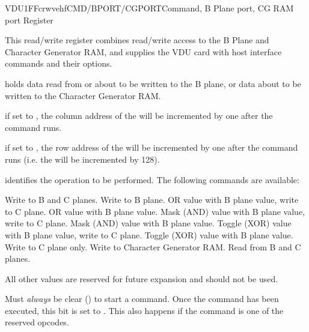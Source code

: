 \begin{ioport}{VDU}{1FF}{crwvehf}{CMD/BPORT/CGPORT}{Command, B Plane port, CG RAM port Register}

  This read/write register combines read/write access to the B Plane
  and Character Generator RAM, and supplies the VDU card with host
  interface commands and their options.

  \begin{bitfield}
  \end{bitfield}

  \begin{description}
     holds data read from or about to be written to the
    B plane, or data about to be written to the Character Generator RAM.
    
     if set to , the column address of the 
    will be incremented by one after the command runs.
    
     if set to , the row address of the 
    will be incremented by one after the command runs (i.e. the  will
    be incremented by 128).
    
     identifies the operation to be performed. The
    following commands are available:
    \begin{description}
       Write to B and C planes.
       Write to B plane.
       OR value with B plane value, write to C plane.
       OR value with B plane value.
       Mask (AND) value with B plane value, write to C plane.
       Mask (AND) value with B plane value.
       Toggle (XOR) value with B plane value, write to C plane.
       Toggle (XOR) value with B plane value.
       Write to C plane only.
       Write to Character Generator RAM.
       Read from B and C planes.
    \end{description}

    All other values are reserved for future expansion and should not be used.

     Must {\em always\/} be clear () to start a
    command. Once the command has been executed, this bit is set to .
    This also happens if the command is one of the reserved opcodes.
  \end{description}


\end{ioport}
